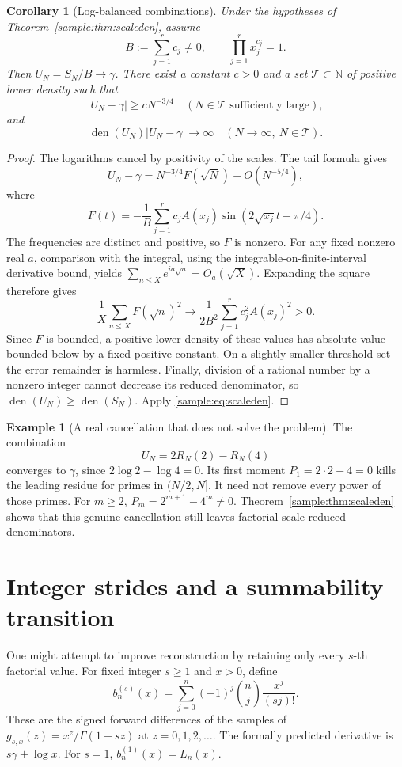 \documentclass[11pt,a4paper]{article}
\newcommand{\N}{\mathbb N}
\DeclareMathOperator{\den}{den}
\newtheorem{corollary}[theorem]{Corollary}
\theoremstyle{definition}
\newtheorem{example}[theorem]{Example}
\theoremstyle{remark}
\numberwithin{equation}{section}
\begin{document}
\begin{corollary}[Log-balanced combinations]\label{sample:cor:logbalance}
Under the hypotheses of Theorem~\ref{sample:thm:scaleden}, assume
\begin{equation}\label{sample:eq:balance}
B:=\sum_{j=1}^r c_j\ne0,\qquad
\prod_{j=1}^r x_j^{c_j}=1.
\end{equation}
Then $U_N=S_N/B\to\gamma$. There exist a constant $c>0$ and a set
$\mathcal T\subset\N$ of positive lower density such that
\[
|U_N-\gamma|\ge cN^{-3/4}\quad(N\in\mathcal T\text{ sufficiently large}),
\]
and
\[
\den(U_N)|U_N-\gamma|\longrightarrow\infty
\quad(N\to\infty,\ N\in\mathcal T).
\]
\end{corollary}
\begin{proof}
The logarithms cancel by positivity of the scales. The tail formula gives
\[
U_N-\gamma=N^{-3/4}F(\sqrt N)+O(N^{-5/4}),
\]
where
\[
F(t)=-\frac1B\sum_{j=1}^r c_jA(x_j)
\sin(2\sqrt{x_j}t-\pi/4).
\]
The frequencies are distinct and positive, so $F$ is nonzero. For any
fixed nonzero real $a$, comparison with the integral, using the
integrable-on-finite-interval derivative bound, yields
$\sum_{n\le X}e^{ia\sqrt n}=O_a(\sqrt X)$.
Expanding the square therefore gives
\[
\frac1X\sum_{n\le X}F(\sqrt n)^2
\longrightarrow\frac1{2B^2}\sum_{j=1}^r c_j^2A(x_j)^2>0.
\]
Since $F$ is bounded, a positive lower density of these values has
absolute value bounded below by a fixed positive constant. On a
slightly smaller threshold set the error remainder is harmless.
Finally, division of a rational number by a nonzero integer cannot
decrease its reduced denominator, so
$\den(U_N)\ge\den(S_N)$. Apply \eqref{sample:eq:scaleden}.
\end{proof}

\begin{example}[A real cancellation that does not solve the problem]
The combination
\[
U_N=2R_N(2)-R_N(4)
\]
converges to $\gamma$, since $2\log2-\log4=0$.
Its first moment $P_1=2\cdot2-4=0$ kills the leading residue for
primes in $(N/2,N]$. It need not remove every power of those primes.
For $m\ge2$, $P_m=2^{m+1}-4^m\ne0$.
Theorem~\ref{sample:thm:scaleden} shows that this genuine cancellation still
leaves factorial-scale reduced denominators.
\end{example}

\section{Integer strides and a summability transition}
\label{sample:sec:stride}
One might attempt to improve reconstruction by retaining only every
$s$-th factorial value. For fixed integer $s\ge1$ and $x>0$, define
\begin{equation}\label{sample:eq:strideb}
b_n^{(s)}(x)=\sum_{j=0}^n(-1)^j\binom nj\frac{x^j}{(sj)!}.
\end{equation}
These are the signed forward differences of the samples of
$g_{s,x}(z)=x^z/\Gamma(1+sz)$ at $z=0,1,2,\ldots$.
The formally predicted derivative is $s\gamma+\log x$.
For $s=1$, $b_n^{(1)}(x)=L_n(x)$.
\end{document}
